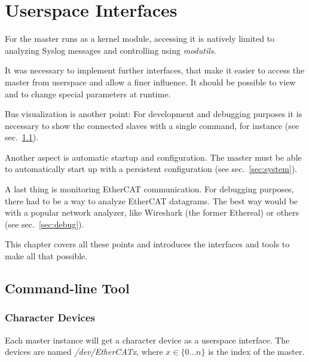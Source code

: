 \documentclass[a4paper,12pt,BCOR6mm,bibtotoc,idxtotoc]{scrbook}
\begin{document}

\chapter{Userspace Interfaces}
\label{sec:user}

For the master runs as a kernel module, accessing it is natively limited to
analyzing Syslog messages and controlling using \textit{modutils}.

It was necessary to implement further interfaces, that make it easier to access
the master from userspace and allow a finer influence. It should be possible
to view and to change special parameters at runtime.

Bus visualization is another point: For development and debugging purposes it
is necessary to show the connected slaves with a single command, for instance
(see sec.~\ref{sec:tool}).

Another aspect is automatic startup and configuration. The master must be able
to automatically start up with a persistent configuration (see
sec.~\ref{sec:system}).

A last thing is monitoring EtherCAT communication. For debugging purposes,
there had to be a way to analyze EtherCAT datagrams. The best way would be
with a popular network analyzer, like Wireshark \cite{wireshark} (the former
Ethereal) or others (see sec.~\ref{sec:debug}).

This chapter covers all these points and introduces the interfaces and tools
to make all that possible.


\section{Command-line Tool}
\label{sec:tool}


\subsection{Character Devices}
\label{sec:cdev}

Each master instance will get a character device as a userspace interface.
The devices are named \textit{/dev/EtherCATx}, where $x \in \{0 \ldots n\}$ is
the index of the master.
\end{document}
